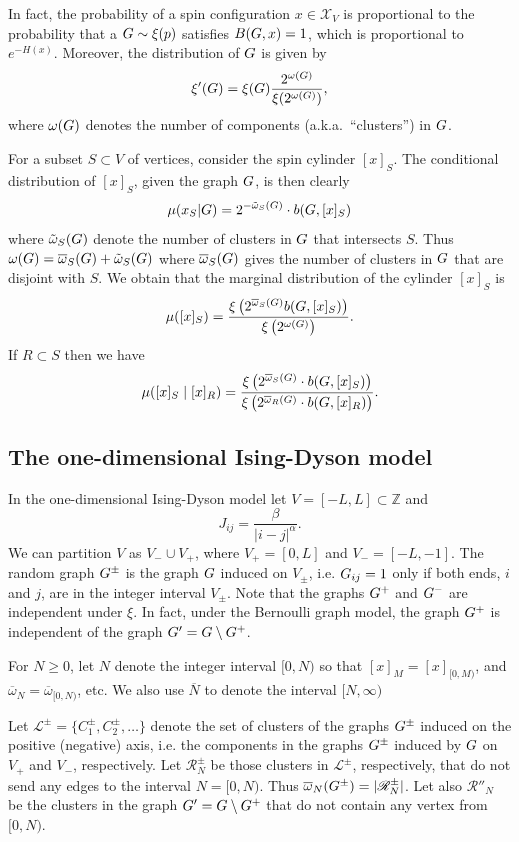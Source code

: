 \documentclass[11pt, a4paper, oneside]{scrartcl}
\theoremstyle{definition}
\theoremstyle{remark}
\providecommand{\ZZ}{\mathbb{Z}}
\providecommand{\mscr}{\mathscr}
\providecommand{\ol}{\overline}
\providecommand{\tl}{\tilde}
\def\X{\mscr X}
\begin{document}
In fact, the probability of a spin configuration $x\in\X_V$ is
proportional to the probability that a $G\sim\xi(p)$ satisfies $B(G,x)=1$, which
is proportional to $e^{-H(x)}$. Moreover, the distribution of $G$ is given by
\[
  \xi'( G ) = \xi(G) \frac{2^{\omega(G)}}{\xi(2^{\omega(G)})},
\]
where $\omega(G)$ denotes the number of components (a.k.a.~``clusters'') in $G$.

\def\cy#1{[x]_{#1}}

For a subset $S\subset V$ of vertices, consider the spin cylinder $\cy S$.
The conditional distribution of $\cy S$, given the graph $G$, is then clearly
\[ \mu(x_S|\t) = 2^{-\tl\omega_S(\t)} \cdot b(\t, \cy S)\]
where $\tl\omega_S(\t)$ denote the number of clusters in $G$ that intersects $S$.
Thus
\(\omega(\t)=\ol\omega_S(\t)+\tl\omega_S(\t)\) where $\ol\omega_S(\t)$ gives the
number of clusters in $G$ that are disjoint with $S$. We obtain that the
marginal distribution of the cylinder $\cy S$ is
\[\mu(\cy S) = \frac{\XI{ 2^{\ol\omega_S(\t)} b(\t,\cy S)}}{\XI{2^{\omega(\t)}}}. \]
If $R\subset S$ then we have
\[\mu(\cy S\mid \cy R) =
  \frac{\XI{2^{\ol\omega_S(\t)} \cdot b(\t,\cy S)}}
  {\XI{2^{\ol\omega_R(\t)} \cdot b(\t,\cy R)}}. \]

\subsection{The one-dimensional Ising-Dyson model}

In the one-dimensional Ising-Dyson model let $V=[-L,L]\subset \ZZ$ and
\[ J_{ij} = \frac \beta{|i-j|^\alpha}.\] We can partition $V$ as $V_- \cup V_+$,
where $V_+=[0,L]$ and $V_-=[-L,-1]$. The random graph $G^\pm$ is the graph $G$
induced on $V_\pm$, i.e. $G_{ij}=1$ only if both ends, $i$ and $j$, are in the
integer interval $V_\pm$. Note that the graphs $G^+$ and $G^-$ are independent
under $\xi$. In fact, under the Bernoulli graph model, the graph $G^+$ is
independent of the graph $G'=G\setminus G^+$.

For $N\ge 0$, let $N$ denote the integer interval $[0,N)$ so that $\cy M = \cy
{[0,M)}$, and $\ol\omega_N = \ol\omega_{[0,N)}$, etc. We also use $\ol N$ to
denote the interval $[N,\infty)$

Let $\mscr L^\pm = \{ C^\pm_1,C^\pm_2, \dots \}$ denote the set of clusters of
the graphs $G^\pm$ induced on the positive (negative) axis, i.e. the components in the
graphs $G^\pm$ induced by $G$ on $V_+$ and $V_-$, respectively. Let $\mscr
R^\pm_N$ be those clusters in $\mscr L^\pm$, respectively, that do not send any
edges to the interval $N=[0,N)$. Thus $\ol\omega_N(\t^\pm)=|\mscr R^\pm_N|$. Let
also $\mscr R''_N$ be the clusters in the graph $G'=G\setminus G^+$ that do
not contain any vertex from $[0,N)$.
\end{document}
